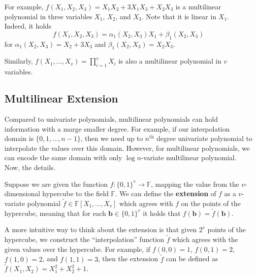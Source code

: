 \documentclass[../../book.tex]{subfiles}
\begin{document}
\begin{example}
    For example, $f(X_1,X_2,X_3)=X_1X_2 + 3X_1X_3 + X_2X_3$ is a multilinear 
    polynomial in three variables $X_1$, $X_2$, and $X_3$. Note that it is linear 
    in $X_1$. Indeed, it holds
    \begin{equation*}
        f(X_1,X_2,X_3) = \alpha_1(X_2,X_3)X_1 + \beta_1(X_2,X_3)
    \end{equation*}
    for $\alpha_1(X_2,X_3) = X_2 + 3X_3$ and $\beta_1(X_2,X_3) = X_2X_3$.

    Similarly, $f(X_1,\dots,X_v)=\prod_{i=1}^v X_i$ is also a multilinear
    polynomial in $v$ variables.
\end{example}

\subsection{Multilinear Extension}

Compared to univariate polynomials, multilinear polynomials can hold information
with a marge smaller degree. For example, if our interpolation domain is
$\{0,1,\dots,n-1\}$, then we need up to $n^{\text{th}}$ degree univariate
polynomial to interpolate the values over this domain. However, for multilinear
polynomials, we can encode the same domain with only $\log n$-variate
multilinear polynomial. Now, the details. 

\begin{definition}
    Suppose we are given the function $f: \{0,1\}^v \to \mathbb{F}$, mapping the
value from the $v$-dimensional hypercube to the field $\mathbb{F}$. We can
define the \textbf{extension} of $f$ as a $v$-variate polynomial $\widetilde{f}
\in \mathbb{F}[X_1,\dots,X_v]$ which agrees with $f$ on the points of the
hypercube, meaning that for each $\boldsymbol{b} \in \{0,1\}^v$ it holds that
$f(\boldsymbol{b}) = \widetilde{f}(\boldsymbol{b})$.
\end{definition}

\begin{example}
    A more intuitive way to think about the extension is that given $2^v$ points
    of the hypercube, we construct the ``interpolation'' function
    $\widetilde{f}$ which agrees with the given values over the hypercube. For
    example, if $f(0,0) = 1$, $f(0,1) = 2$, $f(1,0) = 2$, and $f(1,1) = 3$, then
    the extension $\widetilde{f}$ can be defined as
    $\widetilde{f}(X_1,X_2)=X_1^2+X_2^2+1$.
\end{example}
\end{document}
